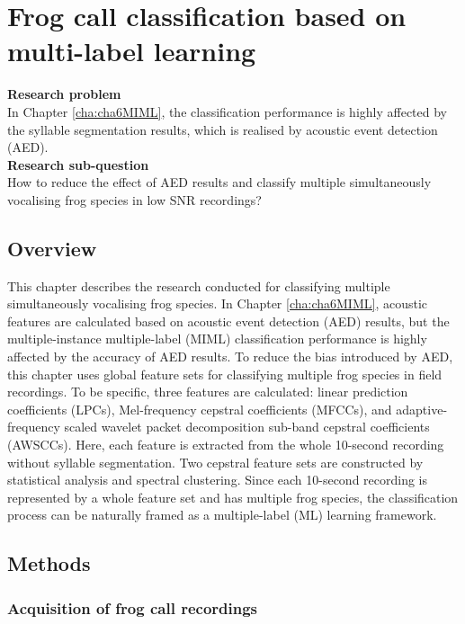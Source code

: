 
\chapter{Frog call classification based on multi-label learning}
\label{cha:cha7ML}
\textbf{Research problem}
\\
In Chapter \ref{cha:cha6MIML}, the classification performance is highly affected by the syllable segmentation results, which is realised by acoustic event detection (AED). 
\\
\textbf{Research sub-question}
\\
How to reduce the effect of AED results and classify multiple simultaneously vocalising frog species in low SNR recordings?


\section{Overview}
\label{sect:introduction}

This chapter describes the research conducted for classifying multiple simultaneously vocalising frog species. In Chapter \ref{cha:cha6MIML}, acoustic features are calculated based on acoustic event detection (AED) results, but the multiple-instance multiple-label (MIML) classification performance is highly affected by the accuracy of AED results. To reduce the bias introduced by AED, this chapter uses global feature sets for classifying multiple frog species in field recordings.
To be specific, three features are calculated: linear prediction coefficients (LPCs), Mel-frequency cepstral coefficients (MFCCs), and adaptive-frequency scaled wavelet packet decomposition sub-band cepstral coefficients (AWSCCs). Here, each feature is extracted from the whole 10-second recording without syllable segmentation. Two cepstral feature sets are constructed by statistical analysis and spectral clustering. Since each 10-second recording is represented by a whole feature set and has multiple frog species, the classification process can be naturally framed as a multiple-label (ML) learning framework.  


\section{Methods}

\subsection{Acquisition of frog call recordings}

